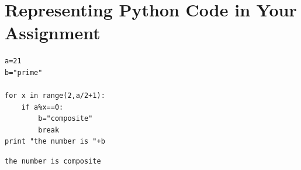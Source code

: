 \documentclass{tufte-handout}
\begin{document}
\vspace{1cm}

\section{Representing Python Code in Your Assignment}


\begin{framed}
\begin{verbatim}
a=21
b="prime"

for x in range(2,a/2+1):
    if a%x==0:
        b="composite"
        break
print "the number is "+b
\end{verbatim}
\end{framed}


\begin{shaded}
\begin{verbatim}
the number is composite
\end{verbatim}
\end{shaded}



\end{document}
